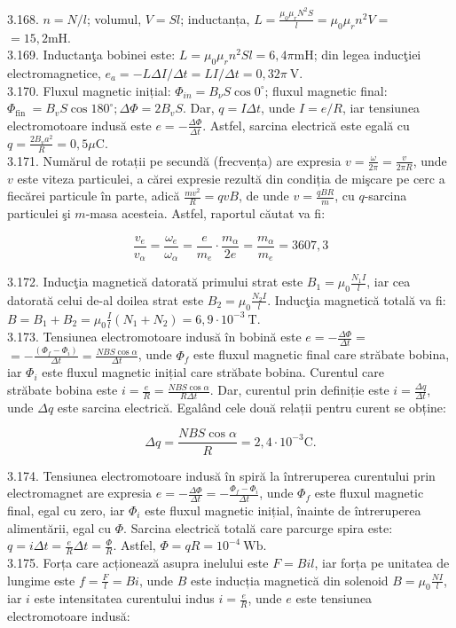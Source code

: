 \documentclass[10pt]{article}
\begin{document}
3.168. $n=N / l$; volumul, $V=S l$; inductanța, $L=\frac{\mu_{0} \mu_{r} N^{2} S}{l}=\mu_{0} \mu_{r} n^{2} V=$ $=15,2 \mathrm{mH}$.\\
3.169. Inductanţa bobinei este: $L=\mu_{0} \mu_{r} n^{2} S l=6,4 \pi \mathrm{mH}$; din legea inducţiei electromagnetice, $e_{a}=-L \Delta I / \Delta t=L I / \Delta t=0,32 \pi \mathrm{~V}$.\\
3.170. Fluxul magnetic inițial: $\Phi_{i n}=B_{\nu} S \cos 0^{\circ}$; fluxul magnetic final: $\Phi_{\text {fin }}=B_{v} S \cos 180^{\circ} ; \Delta \Phi=2 B_{v} S$. Dar, $q=I \Delta t$, unde $I=e / R$, iar tensiunea electromotoare indusă este $e=-\frac{\Delta \Phi}{\Delta t}$. Astfel, sarcina electrică este egală cu $q=\frac{2 B_{v} a^{2}}{R}=0,5 \mu \mathrm{C}$.\\
3.171. Numărul de rotații pe secundă (frecvența) are expresia $v=\frac{\omega}{2 \pi}=\frac{v}{2 \pi R}$, unde $v$ este viteza particulei, a cărei expresie rezultă din condiția de mişcare pe cerc a fiecărei particule în parte, adică $\frac{m v^{2}}{R}=q v B$, de unde $v=\frac{q B R}{m}$, cu $q$-sarcina particulei şi $m$-masa acesteia. Astfel, raportul căutat va fi:

$$
\frac{v_{e}}{v_{\alpha}}=\frac{\omega_{e}}{\omega_{\alpha}}=\frac{e}{m_{e}} \cdot \frac{m_{\alpha}}{2 e}=\frac{m_{\alpha}}{m_{e}}=3607,3
$$

3.172. Inducţia magnetică datorată primului strat este $B_{1}=\mu_{0} \frac{N_{1} I}{l}$, iar cea datorată celui de-al doilea strat este $B_{2}=\mu_{0} \frac{N_{2} I}{l}$. Inducţia magnetică totală va fi: $B=B_{1}+B_{2}=\mu_{0} \frac{I}{l}\left(N_{1}+N_{2}\right)=6,9 \cdot 10^{-3} \mathrm{~T}$.\\
3.173. Tensiunea electromotoare indusă în bobină este $e=-\frac{\Delta \Phi}{\Delta t}=$ $=-\frac{\left(\Phi_{f}-\Phi_{i}\right)}{\Delta t}=\frac{N B S \cos \alpha}{\Delta t}$, unde $\Phi_{f}$ este fluxul magnetic final care străbate bobina, iar $\Phi_{i}$ este fluxul magnetic inițial care străbate bobina. Curentul care\\
străbate bobina este $i=\frac{e}{R}=\frac{N B S \cos \alpha}{R \Delta t}$. Dar, curentul prin definiție este $i=\frac{\Delta q}{\Delta t}$, unde $\Delta q$ este sarcina electrică. Egalând cele două relații pentru curent se obține:

$$
\Delta q=\frac{N B S \cos \alpha}{R}=2,4 \cdot 10^{-3} \mathrm{C} .
$$

3.174. Tensiunea electromotoare indusă în spiră la întreruperea curentului prin electromagnet are expresia $e=-\frac{\Delta \Phi}{\Delta t}=-\frac{\Phi_{f}-\Phi_{i}}{\Delta t}$, unde $\Phi_{f}$ este fluxul magnetic final, egal cu zero, iar $\Phi_{i}$ este fluxul magnetic inițial, înainte de întreruperea alimentării, egal cu $\Phi$. Sarcina electrică totală care parcurge spira este: $q=i \Delta t=\frac{e}{R} \Delta t=\frac{\Phi}{R}$. Astfel, $\Phi=q R=10^{-4} \mathrm{~Wb}$.\\
3.175. Forța care acționează asupra inelului este $F=B i l$, iar forța pe unitatea de lungime este $f=\frac{F}{l}=B i$, unde $B$ este inducția magnetică din solenoid $B=\mu_{0} \frac{N I}{l}$, iar $i$ este intensitatea curentului indus $i=\frac{e}{R}$, unde $e$ este tensiunea electromotoare indusă:
\end{document}

